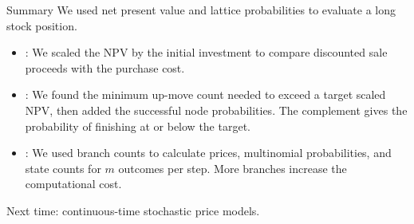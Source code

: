 \documentclass[aspectratio=169,11pt]{beamer}
\begin{document}
\begin{frame}{Summary}
We used net present value and lattice probabilities to evaluate a long stock position.

  \vspace{0.7em}
  {\large\textbf{}}
  \vspace{0.3em}
  \begin{itemize}\setlength{\itemsep}{0.55em}
    \item {}: We scaled the NPV by the initial
      investment to compare discounted sale proceeds with the purchase cost.
    \item {}: We found the minimum up-move
      count needed to exceed a target scaled NPV, then added the successful
      node probabilities. The complement gives the probability of finishing
      at or below the target.
    \item {}: We used branch counts to calculate
      prices, multinomial probabilities, and state counts for $m$ outcomes per
      step. More branches increase the computational cost.
  \end{itemize}

  \vspace{0.5em}
  Next time: continuous-time stochastic price models.
\end{frame}

\end{document}
